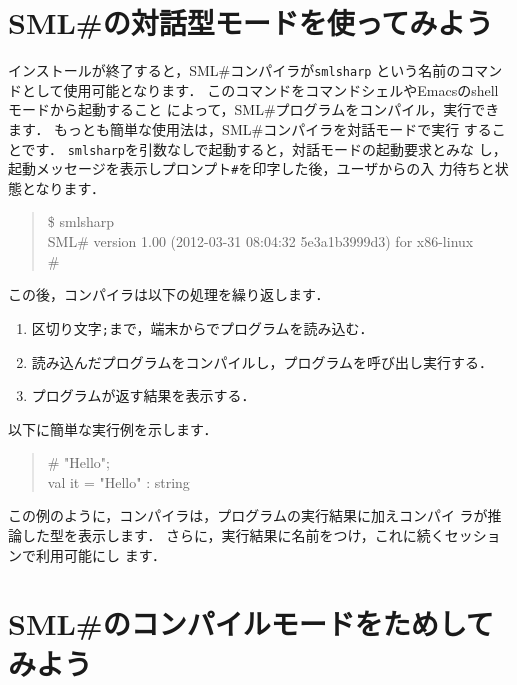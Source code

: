 \documentclass{jbook}
\newcommand{\smlsharp}{SML\#}
\begin{document}
\section{\smlsharp{}の対話型モードを使ってみよう}
\label{sec:tutorialInteractive}

	インストールが終了すると，\smlsharp{}コンパイラが{\tt smlsharp}
という名前のコマンドとして使用可能となります．
	このコマンドをコマンドシェルやEmacsのshellモードから起動すること
によって，\smlsharp{}プログラムをコンパイル，実行できます．
	もっとも簡単な使用法は，\smlsharp{}コンパイラを対話モードで実行
することです．
	{\tt smlsharp}を引数なしで起動すると，対話モードの起動要求とみな
し，起動メッセージを表示しプロンプト{\tt \#}を印字した後，ユーザからの入
力待ちと状態となります．
\begin{tt}
\begin{quote}
\$ smlsharp\\
SML\# version 1.00 (2012-03-31 08:04:32 5e3a1b3999d3) for x86-linux\\
\# 
\end{quote}
\end{tt}
	この後，コンパイラは以下の処理を繰り返します．
\begin{enumerate}
\item 区切り文字{\tt ;}まで，端末からでプログラムを読み込む．
\item 読み込んだプログラムをコンパイルし，プログラムを呼び出し実行する．
\item プログラムが返す結果を表示する．
\end{enumerate}
	以下に簡単な実行例を示します．
\begin{tt}
\begin{quote}
\# "Hello";\\
val it = "Hello" : string
\end{quote}
\end{tt}
	この例のように，コンパイラは，プログラムの実行結果に加えコンパイ
ラが推論した型を表示します．
	さらに，実行結果に名前をつけ，これに続くセッションで利用可能にし
ます．

\section{\smlsharp{}のコンパイルモードをためしてみよう}
\label{sec:tutorialCompile}
\end{document}
